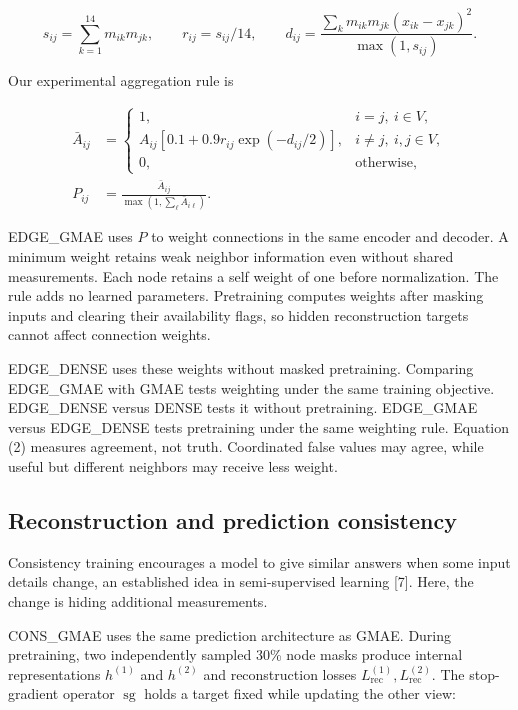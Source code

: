 \documentclass[11pt,letterpaper]{article}
\begin{document}
\[
s_{ij}=\sum_{k=1}^{14}m_{ik}m_{jk},\qquad
r_{ij}=s_{ij}/14,\qquad
d_{ij}=\frac{\sum_k m_{ik}m_{jk}(x_{ik}-x_{jk})^2}{\max(1,s_{ij})}.
\tag{1}
\]

Our experimental aggregation rule is\par

\[
\begin{aligned}\bar A_{ij}&=
\begin{cases}
1,&i=j,\ i\in V,\\
A_{ij}[0.1+0.9r_{ij}\exp(-d_{ij}/2)],&i\ne j,\ i,j\in V,\\
0,&\text{otherwise},
\end{cases}
\\[3pt]
P_{ij}&=\frac{\bar A_{ij}}{\max(1,\sum_\ell\bar A_{i\ell})}.
\end{aligned}
\tag{2}
\]

EDGE\_GMAE uses \(P\) to weight connections in the same encoder and decoder. A minimum weight retains weak neighbor information even without shared measurements. Each node retains a self weight of one before normalization. The rule adds no learned parameters. Pretraining computes weights after masking inputs and clearing their availability flags, so hidden reconstruction targets cannot affect connection weights.\par

EDGE\_DENSE uses these weights without masked pretraining. Comparing EDGE\_GMAE with GMAE tests weighting under the same training objective. EDGE\_DENSE versus DENSE tests it without pretraining. EDGE\_GMAE versus EDGE\_DENSE tests pretraining under the same weighting rule. Equation (2) measures agreement, not truth. Coordinated false values may agree, while useful but different neighbors may receive less weight.\par

\subsection{Reconstruction and prediction consistency}

Consistency training encourages a model to give similar answers when some input details change, an established idea in semi-supervised learning [7]. Here, the change is hiding additional measurements.\par

CONS\_GMAE uses the same prediction architecture as GMAE. During pretraining, two independently sampled 30\% node masks produce internal representations \(h^{(1)}\) and \(h^{(2)}\) and reconstruction losses \(L_{\mathrm{rec}}^{(1)},L_{\mathrm{rec}}^{(2)}\). The stop-gradient operator \(\operatorname{sg}\) holds a target fixed while updating the other view:\par
\end{document}
